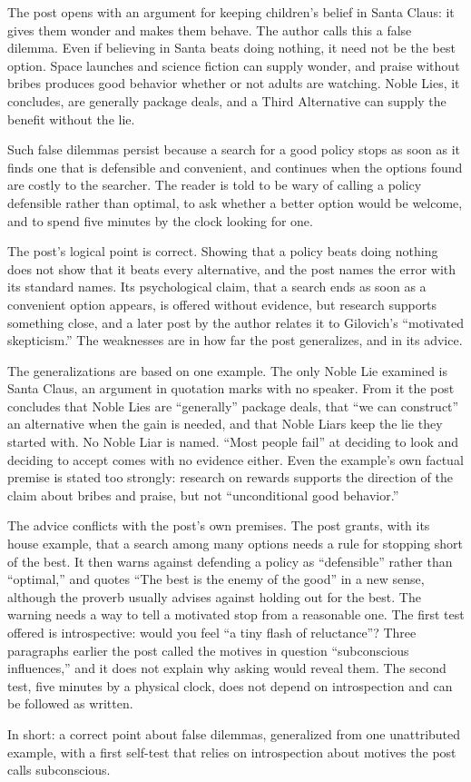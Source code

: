 \begin{afterword}
\summaryhead

The post opens with an argument for keeping children's belief in Santa Claus: it gives them wonder and makes them behave. The author calls this a false dilemma. Even if believing in Santa beats doing nothing, it need not be the best option. Space launches and science fiction can supply wonder, and praise without bribes produces good behavior whether or not adults are watching. Noble Lies, it concludes, are generally package deals, and a Third Alternative can supply the benefit without the lie.

Such false dilemmas persist because a search for a good policy stops as soon as it finds one that is defensible and convenient, and continues when the options found are costly to the searcher. The reader is told to be wary of calling a policy defensible rather than optimal, to ask whether a better option would be welcome, and to spend five minutes by the clock looking for one.

\responsehead

The post's logical point is correct. Showing that a policy beats doing nothing does not show that it beats every alternative, and the post names the error with its standard names. Its psychological claim, that a search ends as soon as a convenient option appears, is offered without evidence, but research supports something close, and a later post by the author relates it to Gilovich's ``motivated skepticism.'' The weaknesses are in how far the post generalizes, and in its advice.

The generalizations are based on one example. The only Noble Lie examined is Santa Claus, an argument in quotation marks with no speaker. From it the post concludes that Noble Lies are ``generally'' package deals, that ``we can construct'' an alternative when the gain is needed, and that Noble Liars keep the lie they started with. No Noble Liar is named. ``Most people fail'' at deciding to look and deciding to accept comes with no evidence either. Even the example's own factual premise is stated too strongly: research on rewards supports the direction of the claim about bribes and praise, but not ``unconditional good behavior.''

The advice conflicts with the post's own premises. The post grants, with its house example, that a search among many options needs a rule for stopping short of the best. It then warns against defending a policy as ``defensible'' rather than ``optimal,'' and quotes ``The best is the enemy of the good'' in a new sense, although the proverb usually advises against holding out for the best. The warning needs a way to tell a motivated stop from a reasonable one. The first test offered is introspective: would you feel ``a tiny flash of reluctance''? Three paragraphs earlier the post called the motives in question ``subconscious influences,'' and it does not explain why asking would reveal them. The second test, five minutes by a physical clock, does not depend on introspection and can be followed as written.

In short: a correct point about false dilemmas, generalized from one unattributed example, with a first self-test that relies on introspection about motives the post calls subconscious.
\end{afterword}
